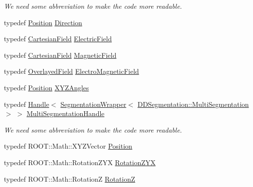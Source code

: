 \begin{DoxyCompactItemize}
\begin{DoxyCompactList}\small\item\em We need some abbreviation to make the code more readable. \item\end{DoxyCompactList}\item 
typedef \hyperlink{namespace_d_d4hep_1_1_geometry_a55083902099d03506c6db01b80404900}{Position} \hyperlink{namespace_d_d4hep_1_1_geometry_a56730a0ddb9f3f089c415cd693bd7c19}{Direction}
\item 
typedef \hyperlink{class_d_d4hep_1_1_geometry_1_1_cartesian_field}{CartesianField} \hyperlink{namespace_d_d4hep_1_1_geometry_a2562a0506900761fa410a92b8d41e665}{ElectricField}
\item 
typedef \hyperlink{class_d_d4hep_1_1_geometry_1_1_cartesian_field}{CartesianField} \hyperlink{namespace_d_d4hep_1_1_geometry_a4335218852430195169d47112d47dde6}{MagneticField}
\item 
typedef \hyperlink{class_d_d4hep_1_1_geometry_1_1_overlayed_field}{OverlayedField} \hyperlink{namespace_d_d4hep_1_1_geometry_a6c49b16dfc8e9487329bfa3b45329f63}{ElectroMagneticField}
\item 
typedef \hyperlink{namespace_d_d4hep_1_1_geometry_a55083902099d03506c6db01b80404900}{Position} \hyperlink{namespace_d_d4hep_1_1_geometry_ab195c63789d4928d291d3b5522151aaa}{XYZAngles}
\item 
typedef \hyperlink{class_d_d4hep_1_1_handle}{Handle}$<$ \hyperlink{class_d_d4hep_1_1_geometry_1_1_segmentation_wrapper}{SegmentationWrapper}$<$ \hyperlink{class_d_d4hep_1_1_d_d_segmentation_1_1_multi_segmentation}{DDSegmentation::MultiSegmentation} $>$ $>$ \hyperlink{namespace_d_d4hep_1_1_geometry_a0cddd542681c17a184500750327bcb64}{MultiSegmentationHandle}
\begin{DoxyCompactList}\small\item\em We need some abbreviation to make the code more readable. \item\end{DoxyCompactList}\item 
typedef ROOT::Math::XYZVector \hyperlink{namespace_d_d4hep_1_1_geometry_a55083902099d03506c6db01b80404900}{Position}
\item 
typedef ROOT::Math::RotationZYX \hyperlink{namespace_d_d4hep_1_1_geometry_a24667b2b9c3cec3d5239828db4d52189}{RotationZYX}
\item 
typedef ROOT::Math::RotationZ \hyperlink{namespace_d_d4hep_1_1_geometry_ac5c5b2c9ea8e14caecff444e8f9678ec}{RotationZ}

\end{DoxyCompactItemize}
